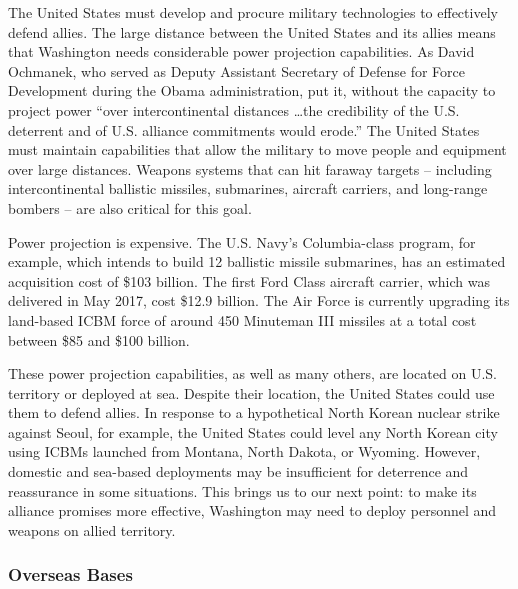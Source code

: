 The United States must develop and procure military technologies to effectively defend allies. %
The large distance between the United States and its allies means that Washington needs considerable power projection capabilities. As David Ochmanek, who served as Deputy Assistant Secretary of Defense for Force Development during the Obama administration, put it, without the capacity to project power ``over intercontinental distances \ldots the credibility of the U.S. deterrent and of U.S. alliance commitments would erode.''\autocite[3]{ochmanekRAND18} The United States must maintain capabilities that allow the military to move people and equipment over large distances. Weapons systems that can hit faraway targets -- including intercontinental ballistic missiles, submarines, aircraft carriers, and long-range bombers -- are also critical for this goal. 

Power projection is expensive. The U.S. Navy's Columbia-class program, for example, which intends to build 12 ballistic missile submarines, has an estimated acquisition cost of \$103 billion.\autocite{crs2020} The first Ford Class aircraft carrier, which was delivered in May 2017, cost \$12.9 billion.\autocite{gao201706} The Air Force is currently upgrading its land-based ICBM force of around 450 Minuteman III missiles at a total cost between \$85 and \$100 billion.\autocite{trevithickTD17} 

These power projection capabilities, as well as many others, are located on U.S. territory or deployed at sea. Despite their location, the United States could use them to defend allies. In response to a hypothetical North Korean nuclear strike against Seoul, for example, the United States could level any North Korean city using ICBMs launched from Montana, North Dakota, or Wyoming. However, domestic and sea-based deployments may be insufficient for deterrence and reassurance in some situations. This brings us to our next point: to make its alliance promises more effective, Washington may need to deploy personnel and weapons on allied territory. 


\subsubsection*{Overseas Bases}

